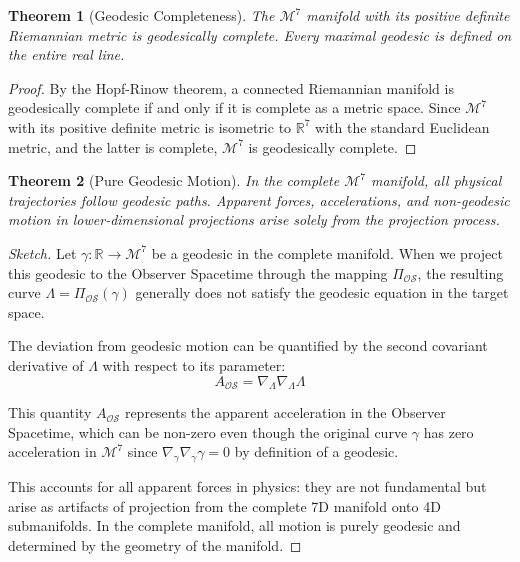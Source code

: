 \documentclass{article}
\newtheorem{theorem}{Theorem}
\begin{document}
\begin{theorem}[Geodesic Completeness]
The $\mathcal{M}^7$ manifold with its positive definite Riemannian metric is geodesically complete. Every maximal geodesic is defined on the entire real line.
\end{theorem}

\begin{proof}
By the Hopf-Rinow theorem, a connected Riemannian manifold is geodesically complete if and only if it is complete as a metric space. Since $\mathcal{M}^7$ with its positive definite metric is isometric to $\mathbb{R}^7$ with the standard Euclidean metric, and the latter is complete, $\mathcal{M}^7$ is geodesically complete.
\end{proof}

\begin{theorem}[Pure Geodesic Motion]
In the complete $\mathcal{M}^7$ manifold, all physical trajectories follow geodesic paths. Apparent forces, accelerations, and non-geodesic motion in lower-dimensional projections arise solely from the projection process.
\end{theorem}

\begin{proof}[Sketch]
Let $\gamma : \mathbb{R} \to \mathcal{M}^7$ be a geodesic in the complete manifold. When we project this geodesic to the Observer Spacetime through the mapping $\Pi_{\mathcal{OS}}$, the resulting curve $\Lambda = \Pi_{\mathcal{OS}}(\gamma)$ generally does not satisfy the geodesic equation in the target space. 

The deviation from geodesic motion can be quantified by the second covariant derivative of $\Lambda$ with respect to its parameter:
\begin{equation}
A_{\mathcal{OS}} = \nabla_\Lambda \nabla_\Lambda \Lambda
\end{equation}

This quantity $A_{\mathcal{OS}}$ represents the apparent acceleration in the Observer Spacetime, which can be non-zero even though the original curve $\gamma$ has zero acceleration in $\mathcal{M}^7$ since $\nabla_\gamma \nabla_\gamma \gamma = 0$ by definition of a geodesic.

This accounts for all apparent forces in physics: they are not fundamental but arise as artifacts of projection from the complete 7D manifold onto 4D submanifolds. In the complete manifold, all motion is purely geodesic and determined by the geometry of the manifold.
\end{proof}
\end{document}

